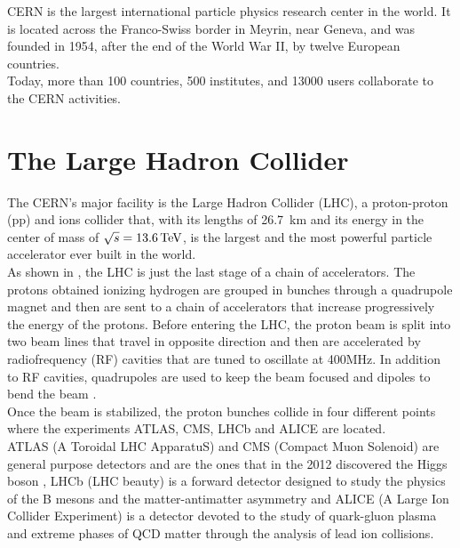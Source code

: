 \label{sec:CMS}
\minitoc

CERN is the largest international particle physics research center in the world. It is located across the Franco-Swiss border in Meyrin, near Geneva, and was founded in 1954, after the end of the World War II, by twelve European countries.\\
Today, more than 100 countries, 500 institutes, and 13000 users collaborate to the CERN activities.

\section{The Large Hadron Collider}
The CERN's major facility is the Large Hadron Collider (LHC), a proton-proton (pp) and ions collider that, with its lengths of 26.7 km and its energy in the center of mass of $\sqrt{s}=13.6{\,\text{Te\hspace{-.08em}V}}$, is the largest and the most powerful particle accelerator ever built in the world.\\
As shown in , the LHC is just the last stage of a chain of accelerators. The protons obtained ionizing hydrogen are grouped in bunches through a quadrupole magnet and then are sent to a chain of accelerators that increase progressively the energy of the protons.
Before entering the LHC, the proton beam is split into two beam lines that travel in opposite direction and then are accelerated by radiofrequency (RF) cavities that are tuned to oscillate at 400MHz. In addition to RF cavities, quadrupoles are used to keep the beam focused and dipoles to bend the beam \cite{Bruning2004LHCReport}.\\
Once the beam is stabilized, the proton bunches collide in four different points where the experiments ATLAS, CMS, LHCb and ALICE are located.\\
ATLAS (A Toroidal LHC ApparatuS) and CMS (Compact Muon Solenoid) are general purpose detectors and are the ones that in the 2012 discovered the Higgs boson  \cite{Chatrchyan2012ObservationLHC,Aad2012ObservationLHC}, LHCb (LHC beauty) is a forward detector designed to study the physics of the B mesons and the matter-antimatter asymmetry and ALICE (A Large Ion Collider Experiment) is a detector devoted to the study of quark-gluon plasma and extreme phases of QCD matter through the analysis of lead ion collisions.
